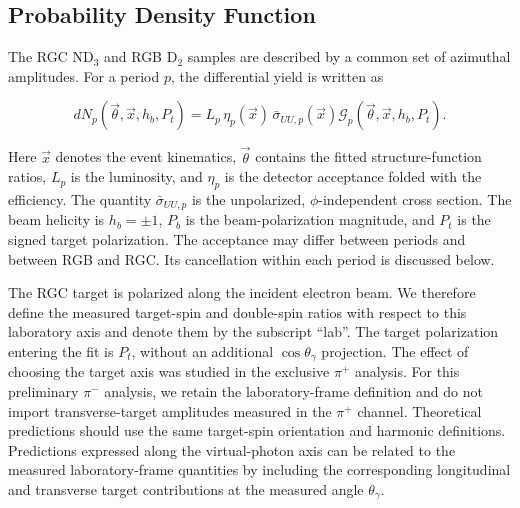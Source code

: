 \subsection{Probability Density Function}
\label{sec:pdf}

The RGC ND$_3$ and RGB D$_2$ samples are described by a common set of azimuthal amplitudes. For a period $p$, the differential yield is written as
\begin{linenomath}
\begin{equation}
\label{eq:pdf}
 dN_p(\vec{\theta},\vec{x},h_b,P_t)
 =L_p\,\eta_p(\vec{x})\,\bar{\sigma}_{UU,p}(\vec{x})
 \mathcal{G}_p(\vec{\theta},\vec{x},h_b,P_t).
\end{equation}
\end{linenomath}
Here $\vec{x}$ denotes the event kinematics, $\vec{\theta}$ contains the fitted structure-function ratios, $L_p$ is the luminosity, and $\eta_p$ is the detector acceptance folded with the efficiency. The quantity $\bar{\sigma}_{UU,p}$ is the unpolarized, $\phi$-independent cross section. The beam helicity is $h_b=\pm1$, $P_b$ is the beam-polarization magnitude, and $P_t$ is the signed target polarization. The acceptance may differ between periods and between RGB and RGC. Its cancellation within each period is discussed below.

The RGC target is polarized along the incident electron beam. We therefore define the measured target-spin and double-spin ratios with respect to this laboratory axis and denote them by the subscript ``lab''. The target polarization entering the fit is $P_t$, without an additional $\cos\theta_\gamma$ projection. The effect of choosing the target axis was studied in the exclusive $\pi^+$ analysis. For this preliminary $\pi^-$ analysis, we retain the laboratory-frame definition and do not import transverse-target amplitudes measured in the $\pi^+$ channel. Theoretical predictions should use the same target-spin orientation and harmonic definitions. Predictions expressed along the virtual-photon axis can be related to the measured laboratory-frame quantities by including the corresponding longitudinal and transverse target contributions at the measured angle $\theta_\gamma$.

